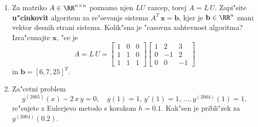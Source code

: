 \begin{enumerate}
  
  \item Za matriko $A\in\RR^{n\times n}$ poznamo njen $LU$ razcep,
        torej $A=L\,U$. Zapi"site {\bf u"cinkovit} algoritem za
            re"sevanje sistema $A^T\,\mathbf{x}=\mathbf{b}$, kjer
            je $\mathbf{b}\in\RR^n$ znani vektor desnih strani sistema.
            Kolik"sna je "casovna zahtevnost algoritma?
            Izra"cunajte $\mathbf{x}$, "ce je
            $$
              A=L\,U=
              \left[
                \begin{array}{ccc}
                  1 & 0 & 0\\
                  1 & 1 & 0\\
                  1 & 1 & 1
                \end{array}
               \right]
               \left[
                \begin{array}{ccc}
                  1 & 2 & 3\\
                  0 & -1 & 2\\
                  0 & 0 & -1
                \end{array}
               \right]
            $$
            in $\mathbf{b}=[6,7,25]^T$.
   \item Za"cetni problem 
     $$y^{(2005)}(x)-2\,x\,y=0,\quad y(1)=1,\,y'(1)=1,\,\dots, y^{(2004)}(1)=1,
     $$
     re"sujete z Eulerjevo metodo s korakom $h=0.1$. Kak"sen je pribli"zek
     za $y^{(2004)}(0.2)$.

\end{enumerate}
 
